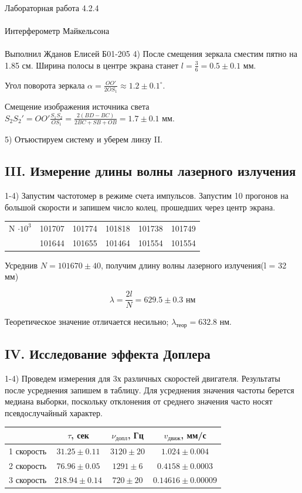 \documentclass{astroedu-lab}
\begin{document}
\begin{problem}{\huge Лабораторная работа 4.2.4\\\\Интерферометр Майкельсона\\\\Выполнил Жданов Елисей Б01-205}
4) После смещения зеркала сместим пятно на 1.85 см. Ширина полосы в центре экрана станет $l = \frac{3}{6} = 0.5 \pm 0.1$ мм.

Угол поворота зеркала $\alpha = \frac{OO'}{2 OS_1} \approx 1.2 \pm 0.1 ^\circ$.

Смещение изображения источника света $S_2 S_2' = O O' \frac{S_1 S_2}{OS_1} = \frac{2 (BD-BC)}{2 BC + SB + OB} = 1.7 \pm 0.1$ мм.

5) Отъюстируем систему и уберем линзу II.

\subsection{III. Измерение длины волны лазерного излучения}

1-4) Запустим частотомер в режиме счета импульсов. Запустим 10 прогонов на большой скорости и запишем число колец, прошедших через центр экрана.

\begin{center}
\begin{tabular}{|c|c|c|c|c|c|}
\hline 
N $\cdot 10^3$ & 101707 &
101774 &
101818 &
101738 &
101749 \\
&101644 &
101655 & 
101464 &
101554 &
101554 \\


\hline
\end{tabular}
\end{center}

Усреднив $N = 101670 \pm 40$, получим длину волны лазерного излучения(l = 32 мм)

$$
	\lambda = \frac{2 l}{N} = 629.5 \pm 0.3 \text{ нм} 
$$

Теоретическое значение отличается несильно; $\lambda_\text{теор} = 632.8$ нм.

\subsection{IV. Исследование эффекта Доплера}

1-4) Проведем измерения для 3х различных скоростей двигателя. Результаты после усреднения запишем в таблицу. Для усреднения значения частоты берется медиана выборки, поскольку отклонения от среднего значения часто носят псевдослучайный характер.

\begin{center}
\begin{tabular}{|c|c|c|c|}
\hline
& $\tau$, сек & $\nu_\text{допл}$, Гц & $v_\text{движ}$, мм/с \\
\hline 
1 скорость & $31.25 \pm 0.11$ & $3120 \pm 20$ & $1.024 \pm 0.004$\\
2 скорость & $76.96 \pm 0.05$ & $1291 \pm 6$ & $0.4158 \pm 0.0003$ \\
3 скорость & $218.94 \pm 0.14$ & $720 \pm 20$ & $0.14616 \pm 0.00009$ \\
\hline
\end{tabular}
\end{center}


\end{problem}
\end{document}
